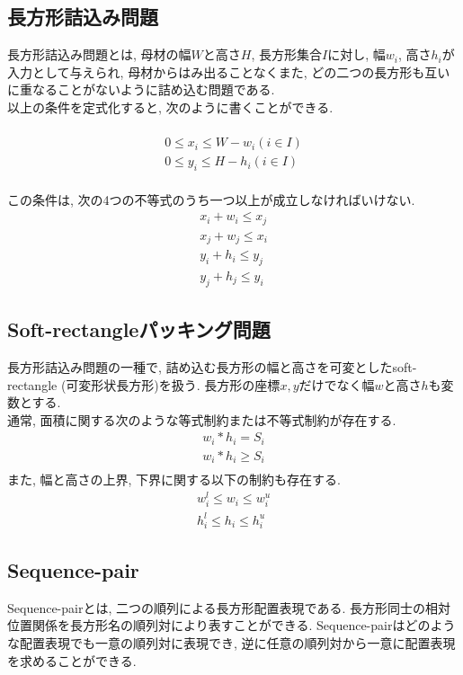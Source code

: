 \subsection{長方形詰込み問題}
長方形詰込み問題とは, 母材の幅$W$と高さ$H$, 長方形集合$I$に対し, 幅$w_i$, 高さ$h_i$が入力として与えられ, 母材からはみ出ることなくまた, どの二つの長方形も互いに重なることがないように詰め込む問題である. \\
以上の条件を定式化すると, 次のように書くことができる. \\
\\
\begin{eqnarray}
    0 \leq x_i \leq W-w_i (i \in I)\\
    0 \leq y_i \leq H-h_i (i \in I)
\end{eqnarray}
\\
この条件は, 次の4つの不等式のうち一つ以上が成立しなければいけない.  
\begin{eqnarray}
    x_i + w_i \leq x_j \\
    x_j + w_j \leq x_i \\
    y_i + h_i \leq y_j \\
    y_j + h_j \leq y_i
\end{eqnarray}

\subsection{Soft-rectangleパッキング問題}
長方形詰込み問題の一種で, 詰め込む長方形の幅と高さを可変としたsoft-rectangle (可変形状長方形)を扱う\cite{soft-rectangle}. 
長方形の座標$x,y$だけでなく幅$w$と高さ$h$も変数とする. \\
通常, 面積に関する次のような等式制約または不等式制約が存在する. \\
\begin{eqnarray}
    w_i * h_i = S_i \\
    w_i * h_i \geq S_i \\
\end{eqnarray}
また, 幅と高さの上界, 下界に関する以下の制約も存在する. 
\begin{eqnarray}
    w_i^l \leq w_i \leq w_i^u \\
    h_i^l \leq h_i \leq h_i^u
\end{eqnarray}

\subsection{Sequence-pair}
Sequence-pairとは, 二つの順列による長方形配置表現である\cite{seq-pair}. 
長方形同士の相対位置関係を長方形名の順列対により表すことができる. 
Sequence-pairはどのような配置表現でも一意の順列対に表現でき, 逆に任意の順列対から一意に配置表現を求めることができる. 


